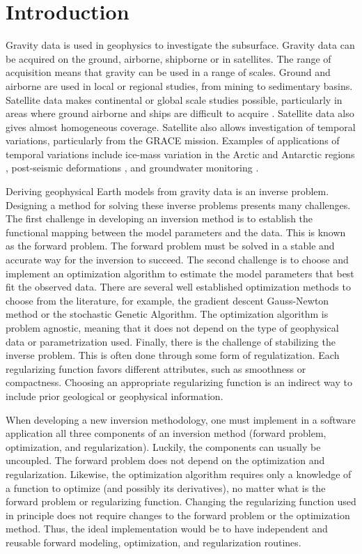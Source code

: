 \chapter{Introduction}


Gravity data is used in geophysics to investigate the subsurface.
Gravity data can be acquired on the ground, airborne, shipborne or in satellites.
The range of acquisition means that gravity can be used in a range of scales.
Ground and airborne are used in local or regional studies, from mining to
sedimentary basins.
Satellite data makes continental or global scale studies possible, particularly
in areas where ground airborne and ships are difficult to acquire
\citep[e.g., ][]{vandermeijde2013, vandermeijde2015, bouman2013,
braitenberg2015, reguzzoni2013}.
Satellite data also gives almost homogeneous coverage.
Satellite also allows investigation of temporal variations, particularly from
the GRACE mission.
Examples of applications of temporal variations include ice-mass variation in
the Arctic and Antarctic regions
\citep{chen2011, ramillien2006},
post-seismic deformations \citep{mikhailov2014},
and groundwater monitoring \citep{humphrey2016}.


Deriving geophysical Earth models from gravity data is an inverse problem.
Designing a method for solving these inverse problems presents many challenges.
The first challenge in developing an inversion method is to establish the
functional mapping between the model parameters and the data.
This is known as the forward problem.
The forward problem must be solved in a stable and accurate way for the
inversion to succeed.
The second challenge is to choose and implement an optimization algorithm to
estimate the model parameters that best fit the observed data.
There are several well established optimization methods to choose from the
literature, for example, the gradient descent Gauss-Newton method or the
stochastic Genetic Algorithm.
The optimization algorithm is problem agnostic, meaning that it does not depend
on the type of geophysical data or parametrization used.
Finally, there is the challenge of stabilizing the inverse problem.
This is often done through some form of regulatization.
Each regularizing function favors different attributes, such as smoothness or
compactness.
Choosing an appropriate regularizing function is an indirect way to include
prior geological or geophysical information.

When developing a new inversion methodology, one must implement in a software
application all three components of an inversion method (forward problem,
optimization, and regularization).
Luckily, the components can usually be uncoupled.
The forward problem does not depend on the optimization and regularization.
Likewise, the optimization algorithm requires only a knowledge of a function to
optimize (and possibly its derivatives), no matter what is the forward problem
or regularizing function.
Changing the regularizing function used in principle does not require changes
to the forward problem or the optimization method.
Thus, the ideal implementation would be to have independent and reusable
forward modeling, optimization, and regularization routines.

